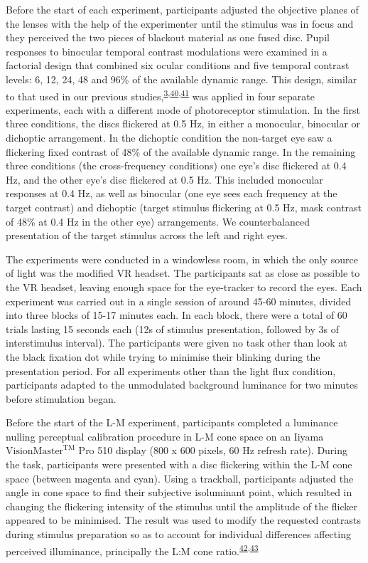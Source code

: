 \documentclass[
]{article}
\begin{document}
Before the start of each experiment, participants adjusted the objective planes of the lenses with the help of the experimenter until the stimulus was in focus and they perceived the two pieces of blackout material as one fused disc. Pupil responses to binocular temporal contrast modulations were examined in a factorial design that combined six ocular conditions and five temporal contrast levels: 6, 12, 24, 48 and 96\% of the available dynamic range. This design, similar to that used in our previous studies,\textsuperscript{\protect\hyperlink{ref-Segala2023}{3},\protect\hyperlink{ref-Baker2017}{40},\protect\hyperlink{ref-Baker2020}{41}} was applied in four separate experiments, each with a different mode of photoreceptor stimulation. In the first three conditions, the discs flickered at 0.5 Hz, in either a monocular, binocular or dichoptic arrangement. In the dichoptic condition the non-target eye saw a flickering fixed contrast of 48\% of the available dynamic range. In the remaining three conditions (the cross-frequency conditions) one eye's disc flickered at 0.4 Hz, and the other eye's disc flickered at 0.5 Hz. This included monocular responses at 0.4 Hz, as well as binocular (one eye sees each frequency at the target contrast) and dichoptic (target stimulus flickering at 0.5 Hz, mask contrast of 48\% at 0.4 Hz in the other eye) arrangements. We counterbalanced presentation of the target stimulus across the left and right eyes.

The experiments were conducted in a windowless room, in which the only source of light was the modified VR headset. The participants sat as close as possible to the VR headset, leaving enough space for the eye-tracker to record the eyes. Each experiment was carried out in a single session of around 45-60 minutes, divided into three blocks of 15-17 minutes each. In each block, there were a total of 60 trials lasting 15 seconds each (12s of stimulus presentation, followed by 3s of interstimulus interval). The participants were given no task other than look at the black fixation dot while trying to minimise their blinking during the presentation period. For all experiments other than the light flux condition, participants adapted to the unmodulated background luminance for two minutes before stimulation began.

Before the start of the L-M experiment, participants completed a luminance nulling perceptual calibration procedure in L-M cone space on an Iiyama \(\textrm{VisionMaster}^{\textrm{TM}}\) Pro 510 display (800 x 600 pixels, 60 Hz refresh rate). During the task, participants were presented with a disc flickering within the L-M cone space (between magenta and cyan). Using a trackball, participants adjusted the angle in cone space to find their subjective isoluminant point, which resulted in changing the flickering intensity of the stimulus until the amplitude of the flicker appeared to be minimised. The result was used to modify the requested contrasts during stimulus preparation so as to account for individual differences affecting perceived illuminance, principally the L:M cone ratio.\textsuperscript{\protect\hyperlink{ref-Carroll2002}{42},\protect\hyperlink{ref-Hofer2005}{43}}
\end{document}

